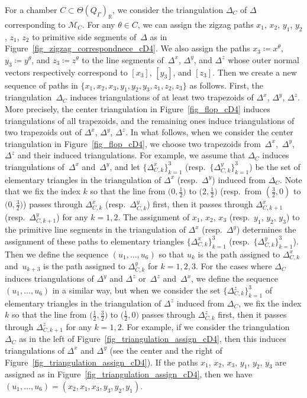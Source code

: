 \documentclass[pdftex]{sigma}
\numberwithin{equation}{section}
\theoremstyle{definition}
\newcommand{\RR}{\mathbb{R}}
\newcommand{\calM}{\mathcal{M}}
\begin{document}
For a chamber $C\subset \Theta(Q_\Gamma)_\RR$, we consider the triangulation $\Delta_C$ of $\Delta$ corresponding to $\calM_C$.
For any $\theta\in C$, we can assign the zigzag paths $x_1$, $x_2$, $y_1$, $y_2$, $z_1$, $z_2$ to primitive side segments of~$\Delta$ as in Figure~\ref{fig_zigzag_correspondnece_cD4}.
We also assign the paths $x_3\coloneqq x^\theta$, $y_3\coloneqq y^\theta$, and $z_3\coloneqq z^\theta$ to
the line segments of~$\Delta^x$, $\Delta^y$, and $\Delta^z$ whose outer normal vectors respectively correspond to $[x_3]$, $[y_3]$, and $[z_3]$.
Then we create a new sequence of paths in $\{x_1,x_2,x_3,y_1,y_2,y_3,z_1,z_2, z_3\}$ as follows.
First, the triangulation~$\Delta_C$ induces triangulations of at least two trapezoids of $\Delta^x$, $\Delta^y$, $\Delta^z$.
More precisely, the center triangulation in Figure~\ref{fig_flop_cD4} induces triangulations of all trapezoids,
and the remaining ones induce triangulations of two trapezoids out of $\Delta^x$, $\Delta^y$, $\Delta^z$.
In what follows, when we consider the center triangulation in Figure~\ref{fig_flop_cD4}, we choose two trapezoids from~$\Delta^x$,~$\Delta^y$,~$\Delta^z$
and their induced triangulations.
For example, we assume that $\Delta_C$ induces triangulations of~$\Delta^x$ and~$\Delta^y$,
and let $\{\Delta_{C,k}^x\}_{k=1}^3$ (resp.\ $\{\Delta_{C,k}^y\}_{k=1}^3$) be the set of elementary triangles
in the triangulation of $\Delta^x$ (resp.\ $\Delta^y$) induced from $\Delta_C$.
Note that we fix the index $k$ so that the line from $\bigl(0,\frac{1}{2}\bigr)$ to $\bigl(2,\frac{1}{2}\bigr)$ (resp.\ from $(\frac{3}{2}, 0)$ to $\bigl(0,\frac{3}{2}\bigr)$)
passes through $\Delta_{C,k}^x$ (resp.\ $\Delta_{C,k}^y$) first, then it passes through $\Delta_{C,k+1}^x$ (resp.\ $\Delta_{C,k+1}^y$) for any $k=1, 2$.
The assignment of $x_1$, $x_2$, $x_3$ (resp.\ $y_1$, $y_2$, $y_3$) to the primitive line segments in the triangulation of $\Delta^x$ (resp.\ $\Delta^y$)
determines the assignment of these paths to elementary triangles $\{\Delta_{C,k}^x\}_{k=1}^3$ (resp.\ $\{\Delta_{C,k}^y\}_{k=1}^3$).
Then we define the sequence $(u_1, \dots, u_6)$ so that $u_k$ is the path assigned to $\Delta_{C,k}^x$ and~$u_{k+3}$ is
the path assigned to $\Delta_{C,k}^y$ for $k=1,2,3$.
For the cases where $\Delta_C$ induces triangulations of $\Delta^y$ and $\Delta^z$ or~$\Delta^z$ and~$\Delta^x$,
we define the sequence $(u_1, \dots, u_6)$ in a similar way, but when we consider
the set $\{\Delta_{C,k}^z\}_{k=1}^3$ of elementary triangles in the triangulation of $\Delta^z$ induced from $\Delta_C$,
we fix the index $k$ so that the line from $\bigl(\frac{1}{2}, \frac{3}{2}\bigr)$ to $\bigl(\frac{1}{2}, 0\bigr)$
passes through $\Delta_{C,k}^z$ first, then it passes through $\Delta_{C,k+1}^z$ for any $k=1, 2$.
For example, if we consider the triangulation $\Delta_C$ as in the left of Figure~\ref{fig_triangulation_assign_cD4},
then this induces triangulations of $\Delta^x$ and $\Delta^y$ (see the center and the right of Figure~\ref{fig_triangulation_assign_cD4}).
If the paths $x_1$, $x_2$, $x_3$, $y_1$, $y_2$, $y_3$ are assigned as in Figure~\ref{fig_triangulation_assign_cD4},
then we have $(u_1, \dots, u_6)=(x_2, x_1, x_3, y_3, y_2, y_1)$.
\end{document}
